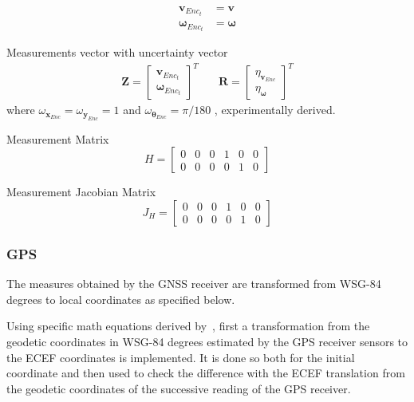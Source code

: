 \begin{align}
\mathbf{v}_{Enc_t} & = \mathbf{v}\\
\boldsymbol \omega_{Enc_t} & = \boldsymbol \omega
\end{align}


Measurements vector with uncertainty vector
\begin{align}
\mathbf{Z}
=
\begin{bmatrix}
\mathbf{v}_{Enc_t} \\
\boldsymbol \omega_{Enc_t}
\end{bmatrix}^T
& \quad
\mathbf{R}
=
\begin{bmatrix}
\eta_{\mathbf{v}_{Enc}} \\
\eta_{\boldsymbol \omega}
\end{bmatrix}^T
\end{align}
where $ \omega_{\mathbf{x}_{Enc}} = \omega_{\mathbf{y}_{Enc}} = 1$ and
$ \omega_{\boldsymbol \theta_{Enc}} = \pi/180 $ , experimentally derived.


Measurement Matrix
\begin{equation}
H
=
\begin{bmatrix}
0 & 0 & 0 & 1 & 0 & 0 \\
0 & 0 & 0 & 0 & 1 & 0
\end{bmatrix}
\end{equation}

Measurement Jacobian Matrix
\begin{equation}
J_H
=
\begin{bmatrix}
0 & 0 & 0 & 1 & 0 & 0 \\
0 & 0 & 0 & 0 & 1 & 0
\end{bmatrix}
\end{equation}


\subsubsection{GPS}

\noindent The measures obtained by the \gls{GNSS} receiver are transformed from WSG-84 degrees to local coordinates as specified below.

Using specific math equations derived by~\cite{Vincenty}, first a transformation from the geodetic coordinates in WSG-84 degrees estimated by the GPS receiver sensors to the ECEF coordinates is implemented.
It is done so both for the initial coordinate and then used to check the difference with the ECEF translation from the geodetic coordinates of the successive reading of the GPS receiver.


